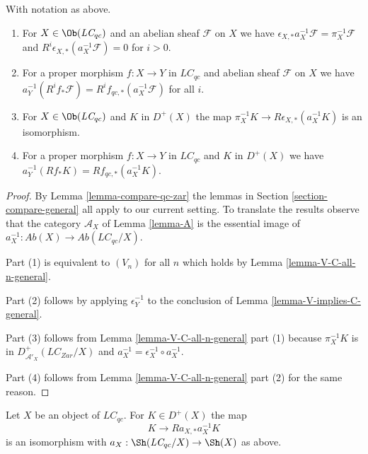 \begin{lemma}
\label{lemma-V-C-all-n}
With notation as above.
\begin{enumerate}
\item For $X \in \Ob(\textit{LC}_{qc})$ and an abelian sheaf $\mathcal{F}$
on $X$ we have $\epsilon_{X, *}a_X^{-1}\mathcal{F} = \pi_X^{-1}\mathcal{F}$
and $R^i\epsilon_{X, *}(a_X^{-1}\mathcal{F}) = 0$ for $i > 0$.
\item For a proper morphism $f : X \to Y$ in $\textit{LC}_{qc}$
and abelian sheaf $\mathcal{F}$ on $X$ we have
$a_Y^{-1}(R^if_*\mathcal{F}) = R^if_{qc, *}(a_X^{-1}\mathcal{F})$
for all $i$.
\item For $X \in \Ob(\textit{LC}_{qc})$ and $K$ in $D^+(X)$ the map
$\pi_X^{-1}K \to R\epsilon_{X, *}(a_X^{-1}K)$ is an isomorphism.
\item For a proper morphism $f : X \to Y$ in $\textit{LC}_{qc}$
and $K$ in $D^+(X)$ we have $a_Y^{-1}(Rf_*K) = Rf_{qc, *}(a_X^{-1}K)$.
\end{enumerate}
\end{lemma}

\begin{proof}
By Lemma \ref{lemma-compare-qc-zar} the lemmas in
Section \ref{section-compare-general} all apply to our current setting.
To translate the results
observe that the category $\mathcal{A}_X$ of Lemma \ref{lemma-A}
is the essential image of
$a_X^{-1} : \textit{Ab}(X) \to \textit{Ab}(\textit{LC}_{qc}/X)$.

\medskip\noindent
Part (1) is equivalent to $(V_n)$ for all $n$ which holds by
Lemma \ref{lemma-V-C-all-n-general}.

\medskip\noindent
Part (2) follows by applying $\epsilon_Y^{-1}$ to the conclusion of
Lemma \ref{lemma-V-implies-C-general}.

\medskip\noindent
Part (3) follows from Lemma \ref{lemma-V-C-all-n-general} part (1)
because $\pi_X^{-1}K$ is in $D^+_{\mathcal{A}'_X}(\textit{LC}_{Zar}/X)$
and $a_X^{-1} = \epsilon_X^{-1} \circ a_X^{-1}$.

\medskip\noindent
Part (4) follows from Lemma \ref{lemma-V-C-all-n-general} part (2)
for the same reason.
\end{proof}

\begin{lemma}
\label{lemma-cohomological-descent-LC}
Let $X$ be an object of $\textit{LC}_{qc}$. For $K \in D^+(X)$ the map
$$
K \longrightarrow Ra_{X, *}a_X^{-1}K
$$
is an isomorphism with $a_X : \Sh(\textit{LC}_{qc}/X) \to \Sh(X)$ as above.
\end{lemma}

